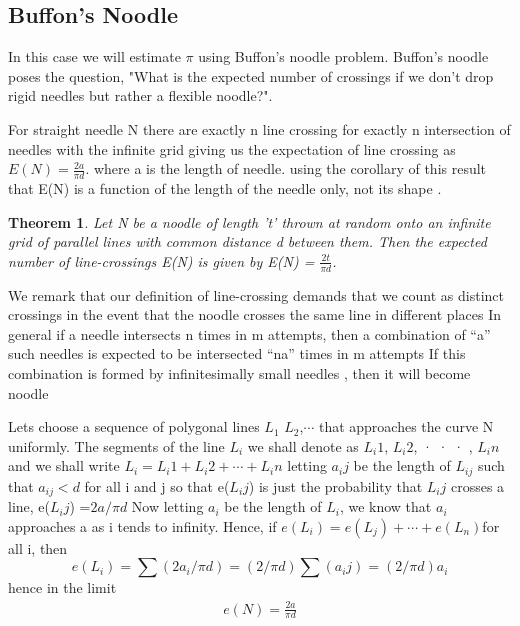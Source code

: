 \documentclass[12pt]{article}
\numberwithin{equation}{section}
\newtheorem{theorem}{Theorem}[section]
\begin{document}
\subsection{Buffon's Noodle}
In this case we will estimate $\pi$ using Buffon's noodle problem. Buffon's noodle poses the question, "What is the expected number of crossings if we don't drop rigid needles but rather a flexible noodle?". \par       
For  straight needle N  there are exactly n line crossing for exactly n intersection of needles with the infinite grid giving us the expectation of line crossing as $E(N)=\frac{2a}{\pi d}$. where a is the length of needle. using the corollary of this result 
 that E(N) is a function of the length of the needle
only, not its shape \cite{noodle}.
\begin{theorem}
Let N be a noodle of length 't' thrown at random onto an infinite
grid of parallel lines with common distance d between them. Then the expected number of line-crossings E(N) is given by E(N) = $\frac{2t}{\pi d}$. 
\end{theorem}
\par
We remark that our definition of line-crossing demands that we count as  distinct crossings in the event that the noodle crosses the same line in different  places
In general if a needle intersects n times in m attempts, then a combination of “a”   such needles is expected to be intersected  “na” times in m attempts
If this combination is formed by infinitesimally  small needles , then it will become noodle\par
Lets choose a  sequence of polygonal lines $L_1$  $L_2$,$\cdots$ that approaches the curve N uniformly. The segments of the line $L_i$ we shall denote as $L_i1$, $L_i2$, · · · , $L_in$ and we
shall write $L_i=L_i1+L_i2+ \cdots +L_in $ 
letting $a_ij$ be the length of $L_{ij}$ such that $a_{ij}<d$ for all i and j 
 so that e($L_ij$) is
just the probability that $L_ij$ crosses a line,
 e($L_ij$) =$ 2a/\pi d$ Now letting $a_i$
be the length of $L_i$, we know that $a_i$ approaches a as i tends to infinity. Hence,
if $e(L_i) = e(L_j) + \cdots +e(L_n) $for all i, then 
\begin{equation}
    e(L_i) = \sum (2a_i/ \pi d) = (2/\pi d) \sum (a_ij) = (2/\pi d)a_i
\end{equation}
hence in the limit 
\begin{align}
e(N)= \frac{2a}{\pi d}
\end{align}
\end{document}

